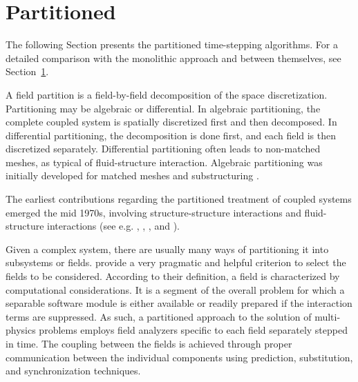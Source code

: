 \section{Partitioned}

The following Section presents the partitioned time-stepping algorithms.
For a detailed comparison with the monolithic approach and between themselves, see Section~\ref{}.

A field partition is a field-by-field decomposition of the space discretization.
Partitioning may be algebraic or differential.
In algebraic partitioning, the complete coupled system is spatially discretized first and then decomposed.
In differential partitioning, the decomposition is done first, and each field is then discretized separately.
Differential partitioning often leads to non-matched meshes, as typical of fluid-structure interaction.
Algebraic partitioning was initially developed for matched meshes and substructuring \citep{felippa_partitioned_2001}.

The earliest contributions regarding the partitioned treatment of coupled systems emerged the mid 1970s, involving structure-structure interactions and fluid-structure interactions (see e.g. \cite{belytschko_mesh_1976}, \cite{park_stabilization_1977}, \cite{belytschko_stability_1978}, \cite{hughes_implicit-explicit_1978} and \cite{belytschko_mixed_1979}).


Given a complex system, there are usually many ways of partitioning it into subsystems or fields.
\cite{felippa_staggered_1980} provide a very pragmatic and helpful criterion to select the fields to be considered.
According to their definition, a field is characterized by computational considerations.
It is a segment of the overall problem for which a separable software module is either available or readily prepared if the interaction terms are suppressed.
As such, a partitioned approach to the solution of multi-physics problems employs field analyzers specific to each field separately stepped in time.
The coupling between the fields is achieved through proper communication between the individual components using prediction, substitution, and synchronization techniques.


